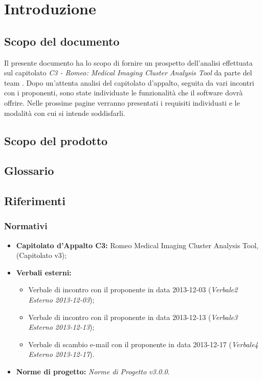 \section{Introduzione}
\label{introduzione}
\subsection{Scopo del documento}
Il presente documento ha lo scopo di fornire un prospetto dell'analisi effettuata sul capitolato \textit{C3 - Romeo: Medical Imaging Cluster\glossario{} Analysis Tool\glossario{}} da parte del team \authorName{}. Dopo un'attenta analisi del capitolato d'appalto, seguita da vari incontri con i proponenti, sono state individuate le funzionalità che il software dovrà offrire. Nelle prossime pagine verranno presentati i requisiti individuati e le modalità con cui si intende soddisfarli.

\subsection{Scopo del prodotto}
\label{scopo_del_prodotto}
\scopoProd{}
\subsection{Glossario}
\glossIntro{}
\subsection{Riferimenti}
\subsubsection{Normativi}
\begin{itemize}
\item\textbf{Capitolato d'Appalto C3:} Romeo Medical Imaging Cluster\glossario{} Analysis Tool\glossario{}, \proposerName{} (Capitolato \project{} v3);
\item\textbf{Verbali esterni:}
\begin{itemize}
\item Verbale di incontro con il proponente in data 2013-12-03 (\textit{Verbale2 Esterno 2013-12-03});
\item Verbale di incontro con il proponente in data 2013-12-13 (\textit{Verbale3 Esterno 2013-12-13});
\item Verbale di scambio e-mail con il proponente in data 2013-12-17 (\textit{Verbale4 Esterno 2013-12-17}).
\end{itemize}
\item\textbf{Norme di progetto:} \textit{Norme di Progetto v3.0.0}.
\end{itemize}

